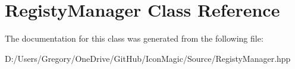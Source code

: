 \hypertarget{class_registy_manager}{}\section{Registy\+Manager Class Reference}
\label{class_registy_manager}


The documentation for this class was generated from the following file\+:\begin{DoxyCompactItemize}
\item 
D\+:/\+Users/\+Gregory/\+One\+Drive/\+Git\+Hub/\+Icon\+Magic/\+Source/Registy\+Manager.\+hpp\end{DoxyCompactItemize}

